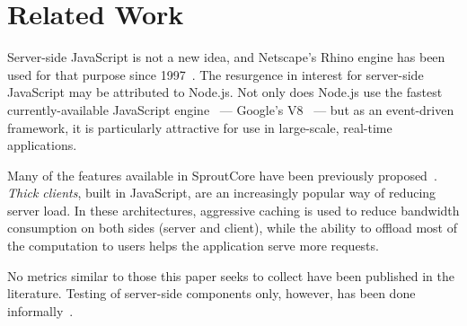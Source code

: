 \section{\label{sec:relwork}Related Work}

Server-side JavaScript is not a new idea, and Netscape's Rhino engine has been used for that purpose since 1997~\cite{rhinohist}. The resurgence in interest for server-side JavaScript may be attributed to Node.js. Not only does Node.js use the fastest currently-available JavaScript engine~\cite{compworld} --- Google's V8~\cite{v8} --- but as an event-driven framework, it is particularly attractive for use in large-scale, real-time applications.

Many of the features available in SproutCore have been previously proposed~\cite{flyhtml}\cite{synckit}. \emph{Thick clients}, built in JavaScript, are an increasingly popular way of reducing server load. In these architectures, aggressive caching is used to reduce bandwidth consumption on both sides (server and client), while the ability to offload most of the computation to users helps the application serve more requests.

No metrics similar to those this paper seeks to collect have been published in the literature. Testing of server-side components only, however, has been done informally~\cite{entcris}\cite{nodevsringo}\cite{nodevserlang}\cite{ericday}.
